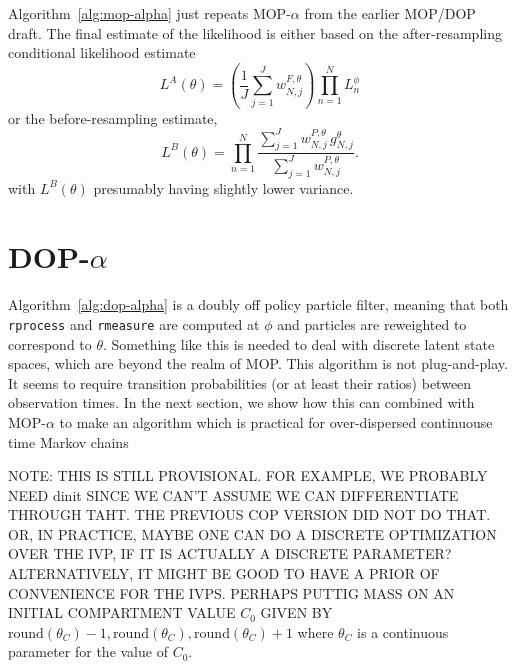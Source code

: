\documentclass[12p]{article}
\newcommand\code[1]{\texttt{#1}}
\begin{document}
Algorithm~\ref{alg:mop-alpha} just repeats MOP-$\alpha$ from the earlier MOP/DOP draft.
The final estimate of the likelihood is either based on the after-resampling conditional likelihood estimate
  \begin{equation} \label{mop:likA}
    L^A(\theta) = \left(\frac{1}{J}\sum_{j=1}^J w^{F,\theta}_{N,j} \right)
    \prod_{n=1}^N L_n^\phi
  \end{equation}
  or the before-resampling estimate,
 \begin{equation}\label{mop:likB}
   L^B(\theta) = \prod_{n=1}^N \frac{\sum_{j=1}^J w^{P,\theta}_{N,j} \, g^{\theta}_{N,j}}{\sum_{j=1}^J w^{P,\theta}_{N,j}}.
  \end{equation}
 with $L^B(\theta)$ presumably having slightly lower variance.

\section{DOP-$\alpha$}

Algorithm~\ref{alg:dop-alpha} is a doubly off policy particle filter, meaning that both \code{rprocess} and \code{rmeasure} are computed at $\phi$ and particles are reweighted to correspond to $\theta$.
Something like this is needed to deal with discrete latent state spaces, which are beyond the realm of MOP.
This algorithm is not plug-and-play.
It seems to require transition probabilities (or at least their ratios) between observation times.
In the next section, we show how this can combined with MOP-$\alpha$ to make an algorithm which is practical for over-dispersed continuouse time Markov chains 

NOTE: THIS IS STILL PROVISIONAL. FOR EXAMPLE, WE PROBABLY NEED dinit SINCE WE CAN'T ASSUME WE CAN DIFFERENTIATE THROUGH TAHT. THE PREVIOUS COP VERSION DID NOT DO THAT. OR, IN PRACTICE, MAYBE ONE CAN DO A DISCRETE OPTIMIZATION OVER THE IVP, IF IT IS ACTUALLY A DISCRETE PARAMETER? ALTERNATIVELY, IT MIGHT BE GOOD TO HAVE A PRIOR OF CONVENIENCE FOR THE IVPS. PERHAPS PUTTIG MASS ON AN INITIAL COMPARTMENT VALUE $C_0$ GIVEN BY $\mathrm{round}(\theta_C)-1, \mathrm{round}(\theta_C), \mathrm{round}(\theta_C)+1$ where $\theta_C$ is a continuous parameter for the value of $C_0$.
\end{document}
